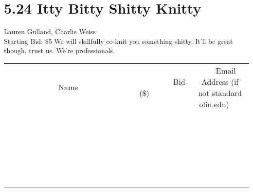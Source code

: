 \documentclass[11pt]{article}
\begin{document}
\section*{5.24 Itty Bitty Shitty Knitty}
Lauren Gulland, Charlie Weiss
\\
Starting Bid: \$5
\newline
We will skillfully co-knit you something shitty. It'll be great though, trust us. We're professionals.
\\[6ex]
\begin{tabular}{c c c}
~~~~~~~~~~~~~Name~~~~~~~~~~~~~ & ~~~~~~~~~Bid (\$)~~~~~~~~~  & ~~~Email Address (if not standard olin.edu)~~~\\
 & & \\
\hline
 & & \\
\hline
 & & \\
\hline
 & & \\
\hline
 & & \\
\hline
 & & \\
\hline
 & & \\
\hline
 & & \\
\hline
 & & \\
\hline
 & & \\
\hline
 & & \\
\hline
 & & \\
\hline
 & & \\
\hline
 & & \\
\hline
 & & \\
\hline
 & & \\
\hline
 & & \\
\hline
 & & \\
\hline
 & & \\
\hline
 & & \\
\hline
 & & \\
\hline
 & & \\
\hline
 & & \\
\hline
 & & \\
\hline
 & & \\
\hline
 & & \\
\hline
\end{tabular}
\newpage
\end{document}
